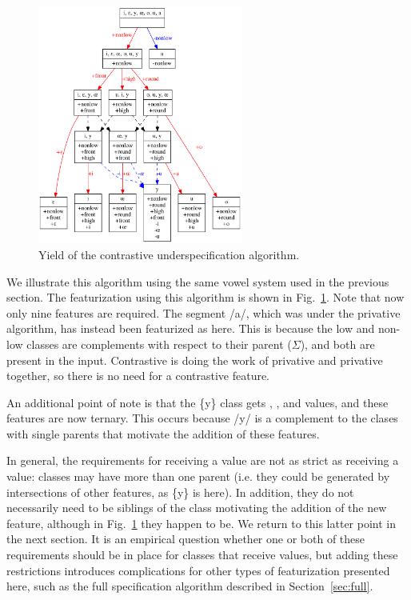 \documentclass[11pt, oneside]{article}   	%
\begin{document}
\begin{figure}[htb!]
	\centering
	\includegraphics[width=0.6\textwidth]{vowel_inventory_contrastive_under.png}
	\caption{Yield of the contrastive underspecification algorithm.}
	\label{fig:vowel_inventory_contrastive_under}
\end{figure}

We illustrate this algorithm using the same vowel system used in the previous section. The featurization using this algorithm is shown in Fig.~\ref{fig:vowel_inventory_contrastive_under}. Note that now only nine features are required. The segment /a/, which was  under the privative algorithm, has instead been featurized as  here. This is because the low and non-low classes are complements with respect to their parent ($\Sigma$), and both are present in the input. Contrastive  is doing the work of privative  and privative  together, so there is no need for a contrastive  feature.

An additional point of note is that the \{y\} class gets , \phonfeat{--\textipa{\oe}}, and  values, and these features are now ternary. This occurs because /y/ is a complement to the clases with single parents that motivate the addition of these features.

In general, the requirements for receiving a  value are not as strict as receiving a  value:  classes may have more than one parent (i.e. they could be generated by intersections of other features, as \{y\} is here). In addition, they do not necessarily need to be siblings of the class motivating the addition of the new feature, although in Fig.~\ref{fig:vowel_inventory_contrastive_under} they happen to be. We return to this latter point in the next section. It is an empirical question whether one or both of these requirements should be in place for classes that receive  values, but adding these restrictions introduces complications for other types of featurization presented here, such as the full specification algorithm described in Section~\ref{sec:full}. 
\end{document}
